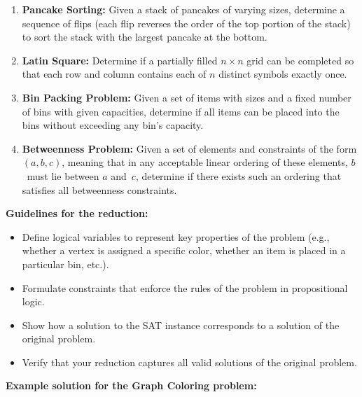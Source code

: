 \documentclass[a4paper,12pt]{article}
\begin{document}
\begin{tasks}
\begin{enumerate}[start=0]
        \item \textbf{Pancake Sorting:}
        Given a stack of pancakes of varying sizes, determine a sequence of flips (each flip reverses the order of the top portion of the stack) to sort the stack with the largest pancake at the bottom.

        \item \textbf{Latin Square:}
        Determine if a partially filled $n \times n$ grid can be completed so that each row and column contains each of $n$ distinct symbols exactly once.

        \item \textbf{Bin Packing Problem:}
        Given a set of items with sizes and a fixed number of bins with given capacities, determine if all items can be placed into the bins without exceeding any bin's capacity.

        \item \textbf{Betweenness Problem:}
        Given a set of elements and constraints of the form $(a,b,c)$, meaning that in any acceptable linear ordering of these elements, $b$~must lie between $a$ and~$c$, determine if there exists such an ordering that satisfies all betweenness constraints.
    \end{enumerate}

    \filbreak

    \textbf{Guidelines for the reduction:}
    \begin{itemize}
        \item Define logical variables to represent key properties of the problem (e.g., whether a vertex is assigned a specific color, whether an item is placed in a particular bin, etc.).
        \item Formulate constraints that enforce the rules of the problem in propositional logic.
        \item Show how a solution to the SAT instance corresponds to a solution of the original problem.
        \item Verify that your reduction captures all valid solutions of the original problem.
    \end{itemize}

    \medskip
    \textbf{Example solution for the Graph Coloring problem:}


\end{tasks}
\end{document}
